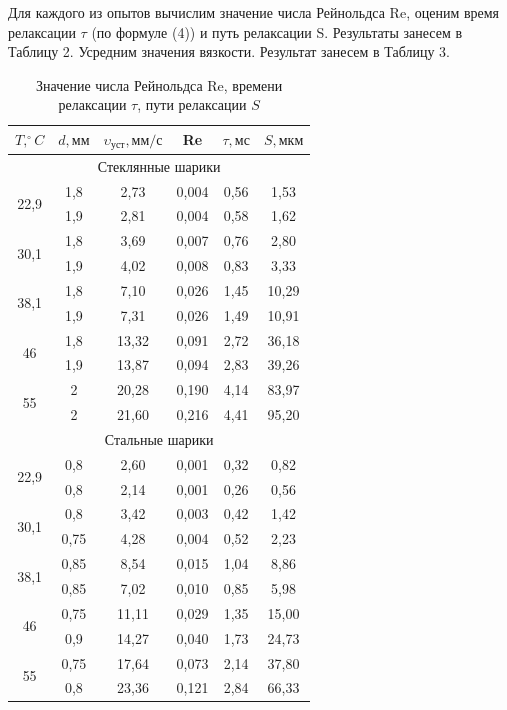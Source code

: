 \documentclass[a4paper,12pt]{article}
\theoremstyle{plain} %
\theoremstyle{definition} %
\theoremstyle{remark} %
\begin{document}
Для каждого из опытов вычислим значение числа Рейнольдса Re, оценим время релаксации $\tau$ (по формуле (4)) и путь релаксации S. Результаты занесем в Таблицу 2. Усредним значения вязкости. Результат занесем в Таблицу 3.

\begin{table}[h]
	\begin{center}
	\begin{tabular}{|c|c|c|c|c|c|}
		\hline
		$T, ^\circ\! C$  & $d, \text{мм}$   & $\upsilon_{\text{уст}}, \text{мм}/\text{с}$    & Re    & $\tau, \text{мс}$  & $S, \text{мкм}$   \\ \hline
		\multicolumn{6}{|c|}{Стеклянные шарики}    \\ \hline
		\multirow{2}{*}{22,9} & 1,8  & 2,73  & 0,004 & 0,56 & 1,53  \\ \cline{2-6}
		& 1,9  & 2,81  & 0,004 & 0,58 & 1,62  \\ \hline
		\multirow{2}{*}{30,1} & 1,8  & 3,69  & 0,007 & 0,76 & 2,80  \\ \cline{2-6}
		& 1,9  & 4,02  & 0,008 & 0,83 & 3,33  \\ \hline
		\multirow{2}{*}{38,1} & 1,8  & 7,10  & 0,026 & 1,45 & 10,29 \\ \cline{2-6}
		& 1,9  & 7,31  & 0,026 & 1,49 & 10,91 \\ \hline
		\multirow{2}{*}{46}   & 1,8  & 13,32 & 0,091 & 2,72 & 36,18 \\ \cline{2-6}
		& 1,9  & 13,87 & 0,094 & 2,83 & 39,26 \\ \hline
		\multirow{2}{*}{55}   & 2    & 20,28 & 0,190 & 4,14 & 83,97 \\ \cline{2-6}
		& 2    & 21,60 & 0,216 & 4,41 & 95,20 \\ \hline
		\multicolumn{6}{|c|}{Стальные шарики}    \\ \hline
		\multirow{2}{*}{22,9}& 0,8  & 2,60  & 0,001 & 0,32 & 0,82  \\ \cline{2-6}
		& 0,8  & 2,14  & 0,001 & 0,26 & 0,56  \\ \hline
		\multirow{2}{*}{30,1} & 0,8  & 3,42  & 0,003 & 0,42 & 1,42  \\ \cline{2-6}
		& 0,75 & 4,28  & 0,004 & 0,52 & 2,23  \\ \hline
		\multirow{2}{*}{38,1} & 0,85 & 8,54  & 0,015 & 1,04 & 8,86  \\ \cline{2-6}
		& 0,85 & 7,02  & 0,010 & 0,85 & 5,98  \\ \hline
		\multirow{2}{*}{46}     & 0,75 & 11,11 & 0,029 & 1,35 & 15,00 \\ \cline{2-6}
		& 0,9  & 14,27 & 0,040 & 1,73 & 24,73 \\ \hline
		\multirow{2}{*}{55}    & 0,75 & 17,64 & 0,073 & 2,14 & 37,80 \\ \cline{2-6}
		& 0,8  & 23,36 & 0,121 & 2,84 & 66,33 \\ \hline
	\end{tabular}
\end{center}
\caption{Значение числа Рейнольдса Re, времени релаксации $\tau$, пути релаксации $S$}
\end{table}
\end{document}
